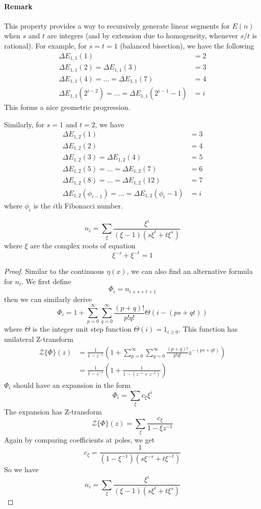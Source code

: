 \documentclass[]{article}
\begin{document}
\paragraph{Remark}

This property provides a way to recursively generate linear segments for $E(n)$ when $s$ and $t$ are integers (and by extension due to homogeneity, whenever $s/t$ is rational). For example, for $s = t = 1$ (balanced bisection), we have the following
\begin{align*}
\Delta E_{1,1}(1) &= 2 \\
\Delta E_{1,1}(2) = \Delta E_{1,1}(3) &= 3\\
\Delta E_{1,1}(4) =\dots = \Delta E_{1,1}(7) &= 4\\
\Delta E_{1,1}(2^{i-2}) =\dots = \Delta E_{1,1}(2^{i-1}-1) &= i
\end{align*}
This forms a nice geometric progression.

Similarly, for $s = 1$ and $t = 2$, we have
\begin{align*}
\Delta E_{1,2}(1) &= 3 \\
\Delta E_{1,2}(2) &= 4\\
\Delta E_{1,2}(3)  = \Delta E_{1,2}(4) &= 5\\
\Delta E_{1,2}(5) =\dots = \Delta E_{1,2}(7) &= 6\\
\Delta E_{1,2}(8) =\dots = \Delta E_{1,2}(12) &= 7\\
\Delta E_{1,2}(\phi_{i -1}) =\dots = \Delta E_{1,2}(\phi_{i} - 1) &= i
\end{align*}
where $\phi_i$ is the $i$th Fibonacci number.

\vspace{1cm}
\begin{lemma}
	\[
	n_i = \sum_{\xi} \frac{\xi^{i}}{(\xi - 1)(s\xi^{t}+t\xi^{s})}
	\]
	where $\xi$ are the complex roots of equation
	\[
	\xi^{-s} + \xi^{-t} = 1
	\]
\end{lemma}
\begin{proof}
Similar to the continuous $\eta(x)$, we can also find an alternative formula for $n_i$. We first define
\[
\Phi_i = n_{i+s+t+1}
\]
then we can similarly derive
\[
\Phi_i = 1 + \sum_{p=0}^{\infty} \sum_{q=0}^{\infty}\frac{(p+q)!}{p!q!} \Theta(i-(ps+qt))
\]
where $\Theta$ is the integer unit step function $\Theta(i) = 1_{i \geq 0}$. This function has unilateral Z-transform
\begin{align*}
\mathcal{Z}\{\Phi\}(z) &= \frac{1}{1-z^{-1}}\left(1 +  \sum_{p=0}^{\infty} \sum_{q=0}^{\infty}\frac{(p+q)!}{p!q!} z^{-(ps+qt)} \right) \\
&= \frac{1}{1-z^{-1}}\left(1 +  \frac{1}{1-(z^{-s} + z^{-t})} \right)
\end{align*}
$\Phi_i$ should have an expansion in the form
\[
\Phi_i = \sum_{\xi} c_{\xi}\xi^i
\]
The expansion has Z-transform
\[
\mathcal{Z}\{\Phi\}(z) = \sum_{\xi} \frac{c_{\xi}}{1-\xi z^{-1}}
\]
Again by comparing coefficients at poles, we get
\[
c_{\xi} = \frac{1}{(1-\xi^{-1})(s\xi^{-s}+t\xi^{-t})}
\]
So we have
\[
n_i = \sum_{\xi} \frac{\xi^{i}}{(\xi - 1)(s\xi^{t}+t\xi^{s})}
\]
\end{proof}
\end{document}
